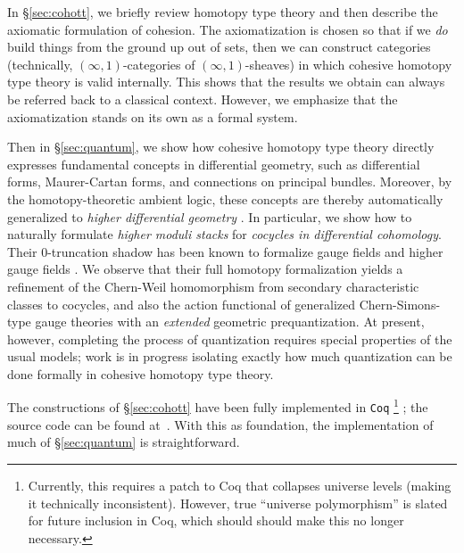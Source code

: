 \documentclass[copyright]{eptcs}
\newcommand{\io}{\ensuremath{(\infty,1)}}
\begin{document}

\vspace{.2cm}

In \S\ref{sec:cohott}, we briefly review homotopy type theory and then describe the axiomatic formulation of cohesion.
The axiomatization is chosen so that if we \emph{do} build things from the ground up out of sets, then we can construct categories (technically, \io-categories of \io-sheaves) in which cohesive homotopy type theory is valid internally.
This shows that the results we obtain can always be referred back to a classical context.
However, we emphasize that the axiomatization stands on its own as a formal system.

Then in \S\ref{sec:quantum}, we show how cohesive homotopy type theory directly expresses
fundamental concepts in differential geometry, such as differential forms,
Maurer-Cartan forms, and connections on principal bundles.
Moreover, by the homotopy-theoretic ambient logic, these concepts are thereby automatically generalized to
\emph{higher differential geometry} \cite{NSS}. In particular,
we show how to naturally formulate
\emph{higher moduli stacks} for \emph{cocycles in differential cohomology}.
Their 0-truncation shadow has been known to
formalize gauge fields and higher gauge fields \cite{Freed}.
We observe that their full homotopy formalization yields a refinement of
the Chern-Weil homomorphism from secondary characteristic classes to
cocycles, and also the action functional of generalized
Chern-Simons-type gauge theories with an \emph{extended} geometric prequantization.
At present, however, completing the process of quantization requires special properties of the usual models; work is in progress isolating exactly how much quantization can be done formally in cohesive homotopy type theory.

The constructions of \S\ref{sec:cohott} have been fully implemented in {\tt Coq}%
\footnote{Currently, this requires a patch to Coq that collapses universe levels (making it technically inconsistent).  However, true ``universe polymorphism'' is slated for future inclusion in Coq, which should should make this no longer necessary.} \cite{Coq};
the source code can be found at~\cite{CohesiveCoq}.  With this as foundation, the implementation
of much of \S\ref{sec:quantum} is straightforward.
\end{document}
